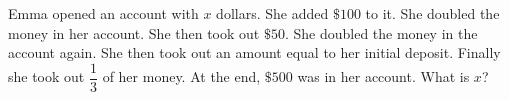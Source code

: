Emma opened an account with $x$ dollars. She added $\$100$ to it. She doubled the money in her account. She then took out $\$50$. She doubled the money in the account again. She then took out an amount equal to her initial deposit. Finally she took out $\dfrac{1}{3}$ of her money. At the end, $\$500$ was in her account. What is $x$?
